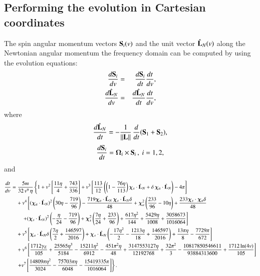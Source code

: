 \documentclass[prd,preprintnumbers,twocolumn,eqsecnum,floatfix,letter]{revtex4}
\begin{document}
\subsection{Performing the evolution in Cartesian coordinates}

The spin angular momentum vectors $\mathbf{S}_i (v)$ and the unit vector $ \hat{\mathbf{L}}_N (v)$ along the Newtonian angular momentum the frequency domain can be computed by using the evolution equations: 
\begin{eqnarray}
\frac{d \mathbf{S}_i}{dv} & = & \frac{d \mathbf{S}_i}{dt}  \frac{dt}{dv}, \\
\frac{d \hat{\mathbf{L}}_N}{dv}  & = & \frac{d \hat{\mathbf{L}}_N}{dt} \frac{dt}{dv},  
\label{eq:precessionEqFreqDom}
\end{eqnarray}
%
where 
\begin{equation}
\frac{d \hat{\mathbf{L}}_N}{dt}  = - \frac{1}{||\mathbf{L}||} \, \frac{d}{dt} (\mathbf{S}_1 + \mathbf{S}_2),
\label{eq:orbitPrec}
\end{equation}
% 
%
\begin{equation}
\frac{d \mathbf{S}_i}{dt}  =  \bm{\Omega}_i \times \mathbf{S}_i \,,~ i = 1,2, 
\label{eq:spinPrec}
\end{equation}
%
and 
% 
\begin{widetext}
\begin{align}\label{eq:EbyF}
\frac{dt}{dv} & = \frac{5m}{32 \, v^9  \, \eta} \left\{1 + v^2 \left[\frac{11 \eta }{4}+\frac{743}{336} \right] 
    + v^3 \left[\frac{113}{12} \left(\biggl( 1-\frac{76\eta}{113}\biggr) \, \bm{\chi}_s \cdot \hat{\mathbf{L}}_N + \delta \, \bm{\chi}_a \cdot \hat{\mathbf{L}}_N \right)-4 \pi \right] \right. \nonumber \\ 
    &\quad + v^4 \left[(\bm{\chi}_a \cdot \hat{\mathbf{L}}_N)^2 \left(30 \eta -\frac{719}{96}\right)-\frac{719 \bm{\chi}_a \cdot \hat{\mathbf{L}}_N \, \bm{\chi}_s \cdot \hat{\mathbf{L}}_N \delta
   }{48}+\bm{\chi}_a^2 \left(\frac{233}{96}-10 \eta \right)+\frac{233 \bm{\chi}_s \cdot \bm{\chi}_a \delta}{48} \right. \nonumber\\
   &\qquad \left. +(\bm{\chi}_s \cdot \hat{\mathbf{L}}_N)^2 \left(-\frac{\eta }{24}-\frac{719}{96}\right)+\bm{\chi}_s^2 \left(\frac{7 \eta
   }{24}+\frac{233}{96}\right)+\frac{617 \eta ^2}{144}+\frac{5429 \eta }{1008}+\frac{3058673}{1016064} \right] \nonumber \\ 
    &\quad + v^5 \left[\bm{\chi}_a \cdot \hat{\mathbf{L}}_N \delta  \left(\frac{7 \eta }{2}+\frac{146597}{2016}\right)+\bm{\chi}_s \cdot \hat{\mathbf{L}}_N \left(-\frac{17 \eta
   ^2}{2}-\frac{1213 \eta }{18}+\frac{146597}{2016}\right)+\frac{13 \pi  \eta }{8}-\frac{7729 \pi }{672} \right]  \nonumber\\ 
    &\quad + v^6 \left[\frac{1712 \gamma_E }{105}+\frac{25565 \eta ^3}{5184}-\frac{15211 \eta
   ^2}{6912}-\frac{451 \pi ^2 \eta }{48}+\frac{3147553127 \eta }{12192768}+\frac{32 \pi
   ^2}{3}-\frac{10817850546611}{93884313600}+\frac{1712 \ln (4v)}{105} \right]  \nonumber\\ 
    &\quad \left. + v^7 \left[\frac{14809 \pi  \eta ^2}{3024}-\frac{75703 \pi  \eta }{6048}-\frac{15419335 \pi }{1016064} \right] \right\}. 
\end{align}
\end{widetext}
\end{document}
